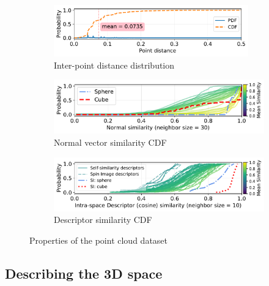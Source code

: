 \begin{figure}[t]
	\begin{subfigure}[]{\columnwidth}
		\includegraphics[width=0.925\textwidth]{figures/plots/point-distance}
		\vspace{-2mm}
		\caption{Inter-point distance distribution}
		\label{fig:point-distance}
	\end{subfigure}
	\begin{subfigure}[]{\columnwidth}
		\centering
		\includegraphics[width=\textwidth]{figures/plots/cdf-normal-similarity}
		\vspace{-5mm}
		\caption{Normal vector similarity CDF}
		\label{fig:cdf-normal-similarity}
	\end{subfigure}
	\begin{subfigure}[]{\columnwidth}
    	\includegraphics[width=\columnwidth]{figures/plots/descriptor-similarity.pdf}
    	\vspace{-4mm}
    	\caption{Descriptor similarity CDF}
    	\label{fig:descriptor-similarity}
	\end{subfigure}
	\vspace {-2mm}
	\caption{Properties of the point cloud dataset}
	\label{fig:point-cloud-properties}
	\vspace {-2mm}
\end{figure}

\subsection{Describing the 3D space}\label{subsec:3D-description}

